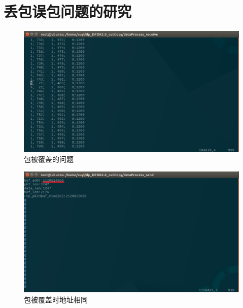 \documentclass{article}
\begin{document}
\section{丢包误包问题的研究}

\begin{figure}[H]
	\centering
	\includegraphics[width = \textwidth]{type-num.png}
	\caption{包被覆盖的问题}
\end{figure}
\begin{figure}[H]
	\centering
	\includegraphics[width = \textwidth]{buf-addr.png}
	\caption{包被覆盖时地址相同}
\end{figure}

\end{document}
